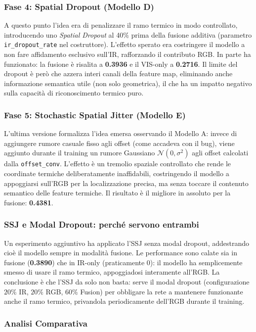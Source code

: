 \documentclass[a4paper,11pt]{article}
\begin{document}
\subsubsection*{Fase 4: Spatial Dropout (Modello D)}
A questo punto l'idea era di penalizzare il ramo termico in modo controllato, introducendo uno \textit{Spatial Dropout} al 40\% prima della fusione additiva (parametro \texttt{ir\_dropout\_rate} nel costruttore). L'effetto sperato era costringere il modello a non fare affidamento esclusivo sull'IR, rafforzando il contributo RGB. In parte ha funzionato: la fusione è risalita a \textbf{0.3936} e il VIS-only a \textbf{0.2716}. Il limite del dropout è però che azzera interi canali della feature map, eliminando anche informazione semantica utile (non solo geometrica), il che ha un impatto negativo sulla capacità di riconoscimento termico puro.
 
\subsubsection*{Fase 5: Stochastic Spatial Jitter (Modello E)}
L'ultima versione formalizza l'idea emersa osservando il Modello A: invece di aggiungere rumore casuale fisso agli offset (come accadeva con il bug), viene aggiunto durante il training un rumore Gaussiano $\mathcal{N}(0, \sigma^2)$ agli offset calcolati dalla \texttt{offset\_conv}. L'effetto è un tremolio spaziale controllato che rende le coordinate termiche deliberatamente inaffidabili, costringendo il modello a appoggiarsi sull'RGB per la localizzazione precisa, ma senza toccare il contenuto semantico delle feature termiche. Il risultato è il migliore in assoluto per la fusione: \textbf{0.4381}.
 
\subsubsection*{SSJ e Modal Dropout: perché servono entrambi}
Un esperimento aggiuntivo ha applicato l'SSJ senza modal dropout, addestrando cioè il modello sempre in modalità fusione. Le performance sono calate sia in fusione (\textbf{0.3890}) che in IR-only (praticamente 0): il modello ha semplicemente smesso di usare il ramo termico, appoggiadosi interamente all'RGB. La conclusione è che l'SSJ da solo non basta: serve il modal dropout (configurazione $20\%$ IR, $20\%$ RGB, $60\%$ Fusion) per obbligare la rete a mantenere funzionante anche il ramo termico, privandola periodicamente dell'RGB durante il training.

\subsubsection*{Analisi Comparativa}
\end{document}
